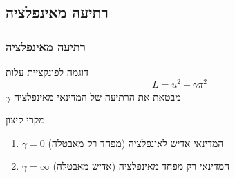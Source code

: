 \documentclass[10pt,usenames,dvipsnames]{beamer}
\begin{document}
\begin{RTL}
\section{רתיעה מאינפלציה}
\begin{frame}
    \frametitle{רתיעה מאינפלציה}
    \begin{block}{דוגמה לפונקציית עלות}
        $$L = u^2 + \gamma \pi^2$$
        $\gamma$ מבטאת את הרתיעה של המדינאי מאינפלציה
    \end{block}
    \begin{alertblock}{מקרי קיצון}
        \begin{enumerate}
            \item $\gamma = 0$ המדינאי אדיש לאינפלציה (מפחד רק מאבטלה)
            \item $\gamma = \infty$ המדינאי רק מפחד מאינפלציה (אדיש מאבטלה)
        \end{enumerate}
    \end{alertblock}
\end{frame}
\end{RTL}
\end{document}
